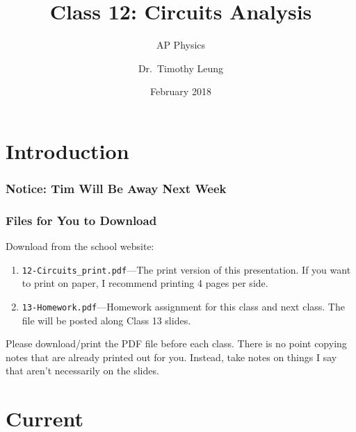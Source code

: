 \documentclass[12pt,aspectratio=169]{beamer}
\title{Class 12: Circuits Analysis}
\subtitle{AP Physics}
\author[TML]{Dr.\ Timothy Leung}
\institute{Olympiads School}
\date{February 2018}
\begin{document}
\begin{frame}
  \maketitle
\end{frame}


\section[Intro]{Introduction}

\begin{frame}
  \frametitle{Notice: Tim Will Be Away Next Week}

  \begin{center}
  \end{center}
\end{frame}

\begin{frame}
  \frametitle{Files for You to Download}
  Download from the school website:
  \begin{enumerate}
  \item\texttt{12-Circuits\_print.pdf}---The print version of this
    presentation. If you want to print on paper, I recommend printing 4 pages
    per side.
  \item\texttt{13-Homework.pdf}---Homework assignment for this class and next
    class. The file will be posted along Class 13 slides.
  \end{enumerate}

  \vspace{.2in}Please download/print the PDF file before each class. There is
  no point copying notes that are already printed out for you. Instead, take
  notes on things I say that aren't necessarily on the slides.
\end{frame}


\section{Current}
\end{document}
